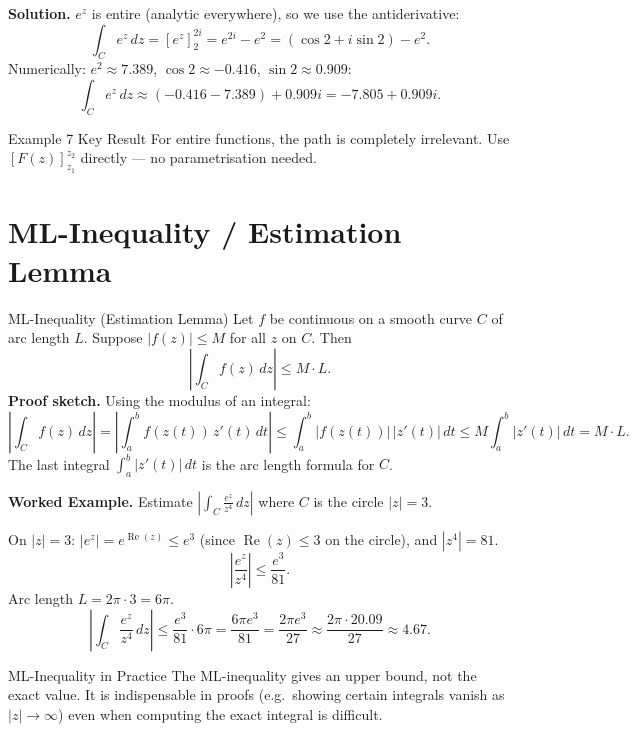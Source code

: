 \documentclass[12pt,a4paper]{article}
\begin{document}
\textbf{Solution.}
$e^z$ is entire (analytic everywhere), so we use the antiderivative:
\[
  \int_C e^z\,dz = \left[e^z\right]_2^{2i}
  = e^{2i} - e^2
  = (\cos 2 + i\sin 2) - e^2.
\]
Numerically: $e^2 \approx 7.389$, $\cos 2 \approx -0.416$, $\sin 2 \approx 0.909$:
\[
  \int_C e^z\,dz \approx (-0.416 - 7.389) + 0.909i = -7.805 + 0.909i.
\]

\begin{learnbox}{Example 7 Key Result}
For entire functions, the path is completely irrelevant. Use
$[F(z)]_{z_1}^{z_2}$ directly --- no parametrisation needed.
\end{learnbox}

\section{ML-Inequality / Estimation Lemma}
\label{sec:ml}
\begin{infobox}{ML-Inequality (Estimation Lemma)}
Let $f$ be continuous on a smooth curve $C$ of arc length $L$. Suppose
$|f(z)| \le M$ for all $z$ on $C$. Then
\[
  \left|\int_C f(z)\,dz\right| \le M \cdot L.
\]
\textbf{Proof sketch.} Using the modulus of an integral:
\[
  \left|\int_C f(z)\,dz\right|
  = \left|\int_a^b f(z(t))\,z'(t)\,dt\right|
  \le \int_a^b |f(z(t))|\,|z'(t)|\,dt
  \le M \int_a^b |z'(t)|\,dt
  = M \cdot L.
\]
The last integral $\int_a^b |z'(t)|\,dt$ is the arc length formula for $C$.
\end{infobox}

\textbf{Worked Example.} Estimate
$\displaystyle\left|\int_C \frac{e^z}{z^4}\,dz\right|$
where $C$ is the circle $|z|=3$.

On $|z|=3$: $|e^z| = e^{\operatorname{Re}(z)} \le e^3$ (since
$\operatorname{Re}(z) \le 3$ on the circle), and $|z^4| = 81$.
\[
  \left|\frac{e^z}{z^4}\right| \le \frac{e^3}{81}.
\]
Arc length $L = 2\pi \cdot 3 = 6\pi$.
\[
  \left|\int_C \frac{e^z}{z^4}\,dz\right| \le \frac{e^3}{81}\cdot 6\pi
  = \frac{6\pi e^3}{81} = \frac{2\pi e^3}{27} \approx \frac{2\pi\cdot 20.09}{27}
  \approx 4.67.
\]

\begin{learnbox}{ML-Inequality in Practice}
The ML-inequality gives an upper bound, not the exact value. It is
indispensable in proofs (e.g.\ showing certain integrals vanish as
$|z| \to \infty$) even when computing the exact integral is difficult.
\end{learnbox}
\end{document}
